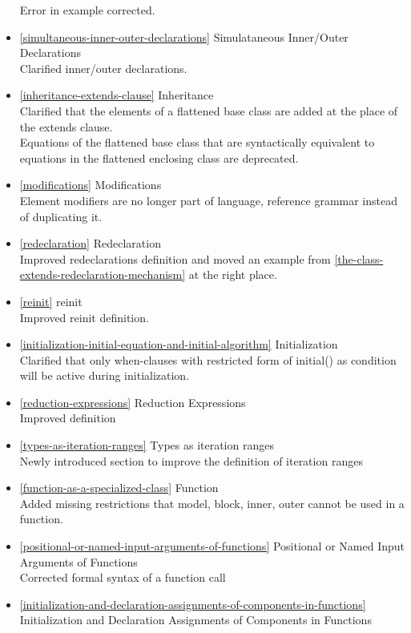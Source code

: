 \documentclass[10pt,a4paper]{report}
\begin{document}
\begin{itemize}
  Error in example corrected.
\item
  \ref{simultaneous-inner-outer-declarations} Simulataneous Inner/Outer Declarations\\
  Clarified inner/outer declarations.
\item
  \ref{inheritance-extends-clause} Inheritance\\
  Clarified that the elements of a flattened base class are added at the
  place of the extends clause.\\
  Equations of the flattened base class that are syntactically
  equivalent to equations in the flattened enclosing class are
  deprecated.
\item
  \ref{modifications} Modifications\\
  Element modifiers are no longer part of language, reference grammar
  instead of duplicating it.
\item
  \ref{redeclaration} Redeclaration\\
  Improved redeclarations definition and moved an example from \ref{the-class-extends-redeclaration-mechanism} at
  the right place.
\item
  \ref{reinit} reinit\\
  Improved reinit definition.
\item
  \ref{initialization-initial-equation-and-initial-algorithm} Initialization\\
  Clarified that only when-clauses with restricted form of initial() as
  condition will be active during initialization.
\item
  \ref{reduction-expressions} Reduction Expressions\\
  Improved definition
\item
  \ref{types-as-iteration-ranges} Types as iteration ranges\\
  Newly introduced section to improve the definition of iteration ranges
\item
  \ref{function-as-a-specialized-class} Function\\
  Added missing restrictions that model, block, inner, outer cannot be
  used in a function.
\item
  \ref{positional-or-named-input-arguments-of-functions} Positional or Named Input Arguments of Functions\\
  Corrected formal syntax of a function call
\item
  \ref{initialization-and-declaration-assignments-of-components-in-functions} Initialization and Declaration Assignments of
  Components in Functions\\

\end{itemize}
\end{document}
